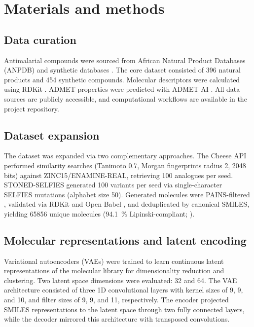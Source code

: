 \documentclass[journal=jcisd8,manuscript=article]{achemso}
\begin{document}
\section{Materials and methods}

\subsection{Data curation}

Antimalarial compounds were sourced from African Natural Product Databases (ANPDB) \cite{Sorokina2021,Onguene2018,NtieKang2017,Simoben2020} and synthetic databases \cite{Knox2023,Spangenberg2013}. The core dataset consisted of \num{396} natural products and \num{454} synthetic compounds. Molecular descriptors were calculated using RDKit \cite{GregLandrum2025}. ADMET properties were predicted with ADMET-AI \cite{Swanson2024}. All data sources are publicly accessible, and computational workflows are available in the project repository.

\subsection{Dataset expansion}

The dataset was expanded via two complementary approaches. The Cheese API \cite{lzicar_cheese_2024} performed similarity searches (Tanimoto \num{0.7}, Morgan fingerprints radius \num{2}, \num{2048} bits) against ZINC15/ENAMINE-REAL, retrieving \num{100} analogues per seed. STONED-SELFIES \cite{Nigam2021} generated \num{100} variants per seed via single-character SELFIES mutations (alphabet size \num{50}). Generated molecules were PAINS-filtered \cite{Baell2010}, validated via RDKit and Open Babel \cite{OBoyle2011}, and deduplicated by canonical SMILES, yielding \num{65856} unique molecules (\qty{94.1}{\percent} Lipinski-compliant; ).

\subsection{Molecular representations and latent encoding}

Variational autoencoders (VAEs) \cite{Kingma2013} were trained to learn continuous latent representations of the molecular library for dimensionality reduction and clustering. Two latent space dimensions were evaluated: \num{32} and \num{64}. The VAE architecture consisted of three 1D convolutional layers with kernel sizes of \num{9}, \num{9}, and \num{10}, and filter sizes of \num{9}, \num{9}, and \num{11}, respectively. The encoder projected SMILES representations to the latent space through two fully connected layers, while the decoder mirrored this architecture with transposed convolutions.
\end{document}
